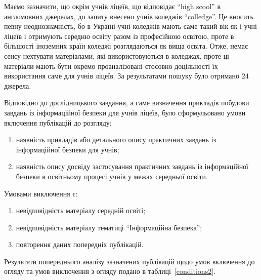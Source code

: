 Маємо зазначити, що окрім учнів ліцеїв, що відповідає ``high scool'' в англомовних джерелах, до запиту внесено учнів коледжів ``colledge''. Це вносить певну неоднозначність, бо в Україні учні коледжів мають саме такий вік як і учні ліцеїв і отримують середню освіту разом із професійною освітою, проте в більшості іноземних країн коледжі розглядаються як вища освіта. Отже, немає сенсу нехтувати матеріалами, які використовуються в коледжах, проте ці матеріали мають бути окремо проаналізовані стосовно доцільності їх використання саме для учнів ліцеїв. За результатами пошуку було отримано 24 джерела.

Відповідно до дослідницького завдання, а саме визначення прикладів побудови завдань із інформаційної безпеки для учнів ліцеїв, було сформульовано умови включення публікацій до розгляду:
\begin{enumerate}[label=\arabic*)]
    \item наявність прикладів або детального опису практичних завдань  із інформаційної безпеки для учнів;
    \item наявність опису досвіду застосування практичних завдань із інформаційної безпеки в освітньому процесі учнів у межах середньої освіти.
\end{enumerate}


Умовами виключення є:
\begin{enumerate} [label=\arabic*)]%
\item невідповідність матеріалу середній освіті;
\item невідповідність матеріалу тематиці ``Інформаційна безпека'';
\item повторення даних попередніх публікацій.
\end{enumerate}
Результати попереднього аналізу зазначених публікацій щодо умов включення до огляду та умов виключення з огляду подано в таблиці~\ref{conditions2}. 



